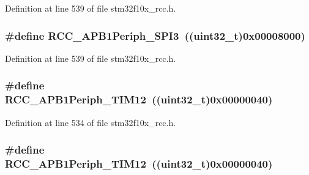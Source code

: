 Definition at line 539 of file stm32f10x\+\_\+rcc.\+h.

\subsubsection[{\texorpdfstring{R\+C\+C\+\_\+\+A\+P\+B1\+Periph\+\_\+\+S\+P\+I3}{RCC_APB1Periph_SPI3}}]{\setlength{\rightskip}{0pt plus 5cm}\#define R\+C\+C\+\_\+\+A\+P\+B1\+Periph\+\_\+\+S\+P\+I3~(({\bf uint32\+\_\+t})0x00008000)}\hypertarget{group___a_p_b1__peripheral_gabb0b40e839ef7403b086482e89d56f35}{}\label{group___a_p_b1__peripheral_gabb0b40e839ef7403b086482e89d56f35}


Definition at line 539 of file stm32f10x\+\_\+rcc.\+h.

\subsubsection[{\texorpdfstring{R\+C\+C\+\_\+\+A\+P\+B1\+Periph\+\_\+\+T\+I\+M12}{RCC_APB1Periph_TIM12}}]{\setlength{\rightskip}{0pt plus 5cm}\#define R\+C\+C\+\_\+\+A\+P\+B1\+Periph\+\_\+\+T\+I\+M12~(({\bf uint32\+\_\+t})0x00000040)}\hypertarget{group___a_p_b1__peripheral_ga0a4ec40233160ca20adaa571073e7bcd}{}\label{group___a_p_b1__peripheral_ga0a4ec40233160ca20adaa571073e7bcd}


Definition at line 534 of file stm32f10x\+\_\+rcc.\+h.

\subsubsection[{\texorpdfstring{R\+C\+C\+\_\+\+A\+P\+B1\+Periph\+\_\+\+T\+I\+M12}{RCC_APB1Periph_TIM12}}]{\setlength{\rightskip}{0pt plus 5cm}\#define R\+C\+C\+\_\+\+A\+P\+B1\+Periph\+\_\+\+T\+I\+M12~(({\bf uint32\+\_\+t})0x00000040)}\hypertarget{group___a_p_b1__peripheral_ga0a4ec40233160ca20adaa571073e7bcd}{}\label{group___a_p_b1__peripheral_ga0a4ec40233160ca20adaa571073e7bcd}


